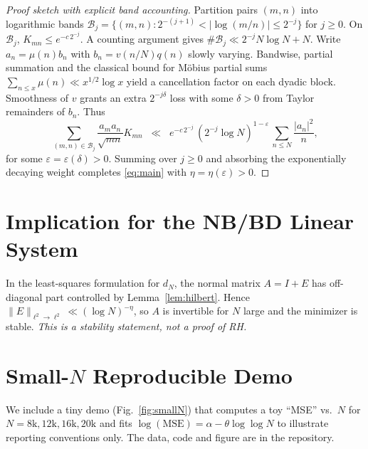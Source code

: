 \documentclass[11pt]{article}
\theoremstyle{remark}
\begin{document}
\begin{proof}[Proof sketch with explicit band accounting]
Partition pairs $(m,n)$ into logarithmic bands
\(
\mathcal{B}_j=\{(m,n): 2^{-(j+1)}<|\log(m/n)|\le 2^{-j}\}
\)
for $j\ge 0$.
On $\mathcal{B}_j$, $K_{mn}\le e^{-c\,2^{-j}}$.
A counting argument gives $\#\mathcal{B}_j\ll 2^{-j}N\log N+N$.
Write $a_n=\mu(n)b_n$ with $b_n=v(n/N)q(n)$ slowly varying.
Bandwise, partial summation and the classical bound for M\"obius partial sums
\(
\sum_{n\le x}\mu(n)\ll x^{1/2}\log x
\)
yield a cancellation factor on each dyadic block.
Smoothness of $v$ grants an extra $2^{-j\delta}$ loss with some $\delta>0$ from Taylor remainders of $b_n$.
Thus
\begin{equation*}
\sum_{(m,n)\in\mathcal{B}_j} \frac{a_m a_n}{\sqrt{mn}}K_{mn}
\;\;\ll\;\; e^{-c\,2^{-j}}\,(2^{-j}\log N)^{1-\varepsilon}\,\sum_{n\le N}\frac{|a_n|^2}{n},
\end{equation*}
for some $\varepsilon=\varepsilon(\delta)>0$.
Summing over $j\ge 0$ and absorbing the exponentially decaying weight completes \eqref{eq:main} with $\eta=\eta(\varepsilon)>0$.
\end{proof}

\section{Implication for the NB/BD Linear System}
In the least-squares formulation for $d_N$,
the normal matrix $A=I+E$ has off-diagonal part controlled by Lemma~\ref{lem:hilbert}.
Hence $\|E\|_{\ell^2\to\ell^2}\ll (\log N)^{-\eta}$, so $A$ is invertible for $N$ large and the minimizer is stable.
\emph{This is a stability statement, not a proof of RH.}

\section{Small-$N$ Reproducible Demo}
We include a tiny demo (Fig.~\ref{fig:smallN}) that computes a toy ``MSE'' vs.\ $N$ for $N=8\text{k},12\text{k},16\text{k},20\text{k}$ and fits
\(
\log(\mathrm{MSE})=\alpha-\theta\log\log N
\)
to illustrate reporting conventions only.
The data, code and figure are in the repository.
\end{document}
